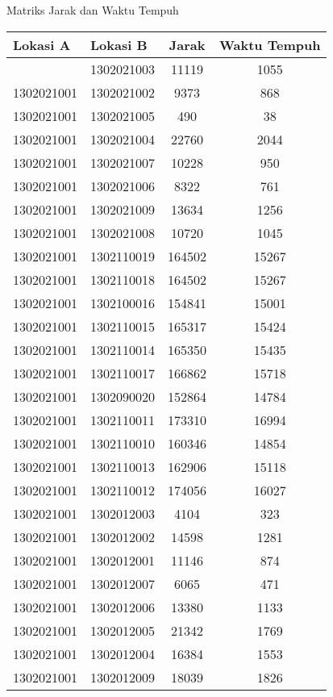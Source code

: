 \begin{table*}\centering
\caption{Matriks Jarak dan Waktu Tempuh}
\label{tbl:distance_duration_matrix_full}
\end{table*}

\begin{longtable}{llcc}
\toprule
Lokasi A & Lokasi B & Jarak & Waktu Tempuh\\ 
\midrule
\endhead
\bottomrule
\endfoot
1302021001 & 1302021003 & 11119 & 1055\\
1302021001 & 1302021002 & 9373 & 868\\
1302021001 & 1302021005 & 490 & 38\\
1302021001 & 1302021004 & 22760 & 2044\\
1302021001 & 1302021007 & 10228 & 950\\
1302021001 & 1302021006 & 8322 & 761\\
1302021001 & 1302021009 & 13634 & 1256\\
1302021001 & 1302021008 & 10720 & 1045\\
1302021001 & 1302110019 & 164502 & 15267\\
1302021001 & 1302110018 & 164502 & 15267\\
1302021001 & 1302100016 & 154841 & 15001\\
1302021001 & 1302110015 & 165317 & 15424\\
1302021001 & 1302110014 & 165350 & 15435\\
1302021001 & 1302110017 & 166862 & 15718\\
1302021001 & 1302090020 & 152864 & 14784\\
1302021001 & 1302110011 & 173310 & 16994\\
1302021001 & 1302110010 & 160346 & 14854\\
1302021001 & 1302110013 & 162906 & 15118\\
1302021001 & 1302110012 & 174056 & 16027\\
1302021001 & 1302012003 & 4104 & 323\\
1302021001 & 1302012002 & 14598 & 1281\\
1302021001 & 1302012001 & 11146 & 874\\
1302021001 & 1302012007 & 6065 & 471\\
1302021001 & 1302012006 & 13380 & 1133\\
1302021001 & 1302012005 & 21342 & 1769\\
1302021001 & 1302012004 & 16384 & 1553\\
1302021001 & 1302012009 & 18039 & 1826\\

\end{longtable}
